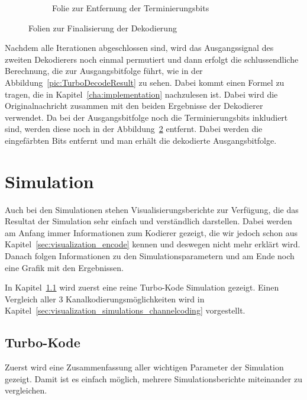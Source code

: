 \begin{figure}[th]
\begin{subfigure}{0.45\textwidth}
	\caption{Folie zur Entfernung der Terminierungsbits}
	\label{pic:TurboDecodeTerminate}
	\end{subfigure}
\caption{Folien zur Finalisierung der Dekodierung}
\end{figure}

Nachdem alle Iterationen abgeschlossen sind, wird das Ausgangssignal des zweiten Dekodierers noch einmal permutiert und dann erfolgt die schlussendliche Berechnung, die zur Ausgangsbitfolge führt, wie in der Abbildung~\ref{pic:TurboDecodeResult} zu sehen. Dabei kommt einen Formel zu tragen, die in Kapitel~\ref{cha:implementation} nachzulesen ist. Dabei wird die Originalnachricht zusammen mit den beiden Ergebnisse der Dekodierer verwendet. Da bei der Ausgangsbitfolge noch die Terminierungsbits inkludiert sind, werden diese noch in der Abbildung~\ref{pic:TurboDecodeTerminate} entfernt. Dabei werden die eingefärbten Bits entfernt und man erhält die dekodierte Ausgangsbitfolge.

\FloatBarrier
\section{Simulation}
\label{sec:visualization_simulation}
Auch bei den Simulationen stehen Visualisierungsberichte zur Verfügung, die das Resultat der Simulation sehr einfach und verständlich darstellen. Dabei werden am Anfang immer Informationen zum Kodierer gezeigt, die wir jedoch schon aus Kapitel~\ref{sec:visualization_encode} kennen und deswegen nicht mehr erklärt wird. Danach folgen Informationen zu den Simulationsparametern und am Ende noch eine Grafik mit den Ergebnissen.

In Kapitel~\ref{sec:visualization_simulations_turbo} wird zuerst eine reine Turbo-Kode Simulation gezeigt. Einen Vergleich aller 3 Kanalkodierungsmöglichkeiten wird in Kapitel~\ref{sec:visualization_simulations_channelcoding} vorgestellt.

\FloatBarrier
\subsection{Turbo-Kode}
\label{sec:visualization_simulations_turbo}
Zuerst wird eine Zusammenfassung aller wichtigen Parameter der Simulation gezeigt. Damit ist es einfach möglich, mehrere Simulationsberichte miteinander zu vergleichen.

